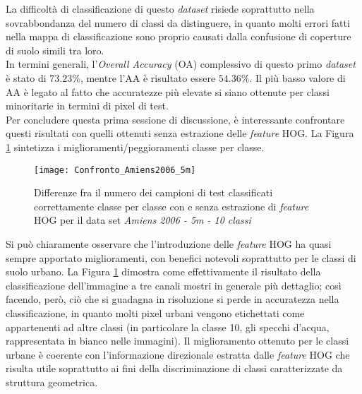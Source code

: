 La difficoltà di classificazione di questo \emph{dataset} risiede
soprattutto nella sovrabbondanza del numero di classi da distinguere,
in quanto molti errori fatti nella mappa di classificazione sono
proprio causati dalla confusione di coperture di suolo simili tra
loro.\\

In termini generali, l'\emph{Overall Accuracy} (OA) complessivo di
questo primo \emph{dataset} è stato di $73.23\%$, mentre l'AA è
risultato essere $54.36\%$. Il più basso valore di AA è legato al
fatto che accuratezze più elevate si siano ottenute per classi
minoritarie in termini di pixel di test.\\

Per concludere questa prima sessione di discussione, è interessante
confrontare questi risultati con quelli ottenuti senza estrazione
delle \emph{feature} HOG. La Figura \ref{fig:Confronto_Amiens2006_5m}
sintetizza i miglioramenti/peggioramenti classe per classe.

\begin{figure}[!ht]

\texttt{[image: Confronto\_Amiens2006\_5m]}

\caption{Differenze fra il numero dei campioni di test classificati correttamente classe per classe con e
senza estrazione di \emph{feature} HOG per il data set \emph{Amiens 2006 - 5m - 10 classi}}

\label{fig:Confronto_Amiens2006_5m}

\end{figure}

Si può chiaramente osservare che l'introduzione delle \emph{feature}
HOG ha quasi sempre apportato miglioramenti, con benefici notevoli
soprattutto per le classi di suolo urbano. La Figura
\ref{fig:Confronto_Amiens2006_5m} dimostra come effettivamente il
risultato della classificazione dell'immagine a tre canali mostri in
generale più dettaglio; così facendo, però, ciò che si guadagna in
risoluzione si perde in accuratezza nella classificazione, in quanto
molti pixel urbani vengono etichettati come appartenenti ad altre
classi (in particolare la classe 10, gli specchi d'acqua,
rappresentata in bianco nelle immagini). Il miglioramento ottenuto per
le classi urbane è coerente con l'informazione direzionale estratta
dalle \emph{feature} HOG che risulta utile soprattutto ai fini della
discriminazione di classi caratterizzate da struttura geometrica.

